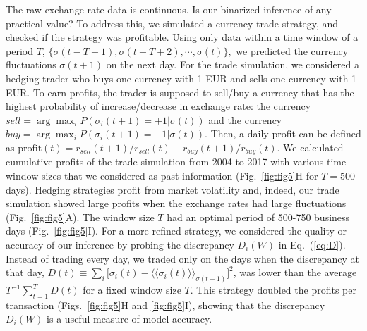 \documentclass[prx,twocolumn,twoside,showpacs,superscriptaddress]{revtex4-1}
\begin{document}
The raw exchange rate data is continuous. Is our binarized inference of any practical value? To address this, we simulated a currency trade strategy, and checked if the strategy was profitable. Using only data within a time window of a period $T$,  $\{\sigma(t-T+1), \sigma(t-T+2), \cdots, \sigma(t) \},$
we predicted the currency fluctuations $\sigma(t+1)$ on the next day.
For the trade simulation, we considered a hedging trader who buys one currency with 1 EUR and sells one currency with 1 EUR.
To earn profits, the trader is supposed to sell/buy a currency that has the highest probability of increase/decrease in exchange rate:
the currency $sell = \arg\max_i P(\sigma_i(t+1)=+1|\sigma(t))$  and the currency $buy = \arg\max_i P(\sigma_i(t+1)=-1|\sigma(t))$.
Then, a daily profit can be defined as ${\text{profit} (t)} = r_{sell}(t+1)/r_{sell}(t) - r_{buy}(t+1)/r_{buy}(t)$.
We calculated cumulative profits of the trade simulation from 2004 to 2017 with various time window sizes that we considered as past information (Fig.~\ref{fig:fig5}H for $T = 500$ days). 
Hedging strategies profit from market volatility and, indeed, our trade simulation showed large profits when the exchange rates had large fluctuations (Fig.~\ref{fig:fig5}A).
The window size $T$ had an optimal period of 500-750 business days (Fig.~\ref{fig:fig5}I).
For a more refined strategy, we considered the quality or accuracy of our inference by probing the discrepancy $D_i(W)$ in Eq.~(\ref{eq:D}).
Instead of trading every day, we traded only on the days when the discrepancy at that day, %
$D(t) \equiv \sum_{i} \big[ \sigma_i(t) - \langle \langle \sigma_{i}(t) \rangle \rangle _{\sigma(t-1)} \big]^2$, was lower than the average $T^{-1} \sum_{t=1}^T D(t)$ for a fixed window size $T$. %
This strategy doubled the profits per transaction (Figs.~\ref{fig:fig5}H and \ref{fig:fig5}I), showing that the discrepancy $D_i(W)$ is a useful measure of model accuracy. 
\end{document}
